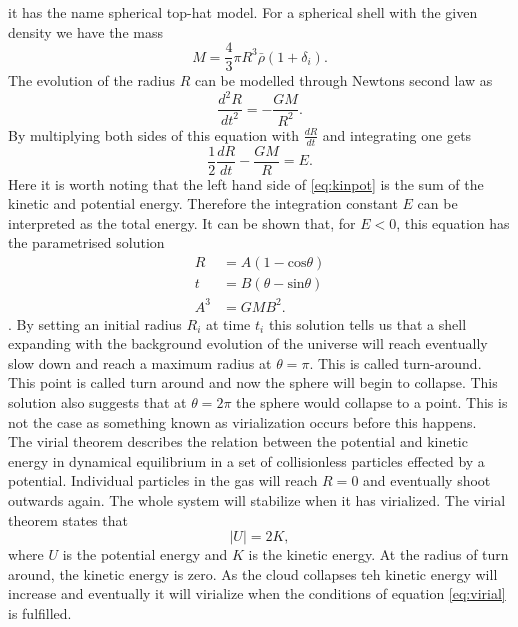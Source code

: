 it has the name spherical top-hat model. For a spherical shell with the given
density we have the mass
\begin{equation}
    M=\frac{4}{3}\pi R^3\bar{\rho}(1+\delta_i).
\end{equation}
The evolution of the radius $R$ can be modelled through Newtons second law as
\begin{equation}
    \frac{d^2R}{dt^2}=-\frac{GM}{R^2}.
\end{equation}
By multiplying both sides of this equation with $\frac{dR}{dt}$ and integrating
one gets
\begin{equation}\label{eq:kinpot}
    \frac{1}{2}\frac{dR}{dt}-\frac{GM}{R}=E.
\end{equation}
Here it is worth noting that the left hand side of \ref{eq:kinpot} is the sum of
the kinetic and potential energy. Therefore the integration constant $E$ can be
interpreted as the total energy. It can be shown that, for
$E<0$, this equation has the parametrised solution
\begin{align}
    R&=A(1-\mathrm{cos}\theta)\\
    t&=B(\theta-\mathrm{sin}\theta)\\
    A^3&=GMB^2.
\end{align}
\cite[p.~79]{peebles1980}. By setting an initial radius $R_i$ at time $t_i$ this
solution tells us that a shell expanding with the background evolution of the
universe will reach eventually slow down and reach a maximum radius at
$\theta=\pi$. This is called turn-around. This point is called turn around and now the sphere will begin to
collapse. This solution also suggests that at $\theta=2\pi$ the sphere would
collapse to a point. This is not the case as something known as virialization
occurs before this happens.\\\indent
The virial theorem describes the relation between the potential and kinetic
energy in dynamical equilibrium in a set of collisionless particles effected by
a potential. Individual particles in the gas will reach $R=0$ and eventually
shoot outwards again. The whole system will stabilize when it has virialized. The virial theorem states that
\begin{equation}\label{eq:virial}
    \vert U\vert=2K,
\end{equation}
where $U$ is the potential energy and $K$ is the kinetic energy.
At the radius of turn around, the kinetic energy is zero. As the cloud collapses
teh kinetic energy will increase and eventually it will virialize when the
conditions of equation \ref{eq:virial} is fulfilled.
